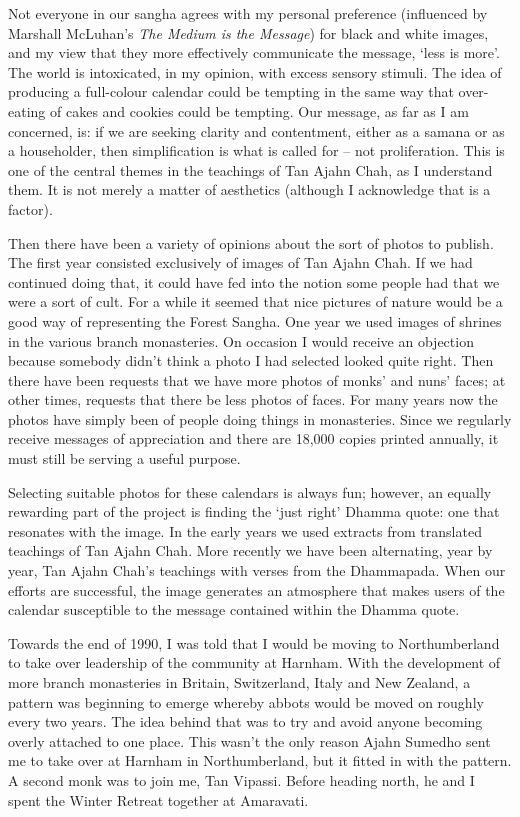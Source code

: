 Not everyone in our sangha agrees with my personal preference
(influenced by Marshall McLuhan's \emph{The Medium is the Message}) for
black and white images, and my view that they more effectively
communicate the message, `less is more'. The world is intoxicated, in my
opinion, with excess sensory stimuli. The idea of producing a
full-colour calendar could be tempting in the same way that over-eating
of cakes and cookies could be tempting. Our message, as far as I am
concerned, is: if we are seeking clarity and contentment, either as a
samana or as a householder, then simplification is what is called for --
not proliferation. This is one of the central themes in the teachings of Tan Ajahn Chah,
as I understand them. It is not merely a matter of aesthetics (although
I acknowledge that is a factor).

Then there have been a variety of opinions about the sort of photos to
publish. The first year consisted exclusively of images of Tan Ajahn
Chah. If we had continued doing that, it could have fed into the notion
some people had that we were a sort of cult. For a while it seemed that
nice pictures of nature would be a good way of representing the Forest
Sangha. One year we used images of shrines in the various branch
monasteries. On occasion I would receive an objection because somebody
didn't think a photo I had selected looked quite right. Then there have
been requests that we have more photos of monks' and nuns' faces; at
other times, requests that there be less photos of faces. For many years
now the photos have simply been of people doing things in monasteries.
Since we regularly receive messages of appreciation and there are 18,000
copies printed annually, it must still be serving a useful
purpose.

Selecting suitable photos for these calendars is always fun; however, an
equally rewarding part of the project is finding the `just right' Dhamma
quote: one that resonates with the image. In the early years we used
extracts from translated teachings of Tan Ajahn Chah. More recently we
have been alternating, year by year, Tan Ajahn Chah's teachings with
verses from the Dhammapada. When our efforts are successful, the image
generates an atmosphere that makes users of the calendar susceptible to
the message contained within the Dhamma quote.

Towards the end of 1990, I was told that I would be moving to
Northumberland to take over leadership of the community at Harnham. With
the development of more branch monasteries in Britain, Switzerland,
Italy and New Zealand, a pattern was beginning to emerge whereby abbots
would be moved on roughly every two years. The idea behind that was to
try and avoid anyone becoming overly attached to one place. This wasn't
the only reason Ajahn Sumedho sent me to take over at Harnham in
Northumberland, but it fitted in with the pattern. A second monk was to
join me, Tan Vipassi. Before heading north, he and I spent the Winter
Retreat together at Amaravati.

